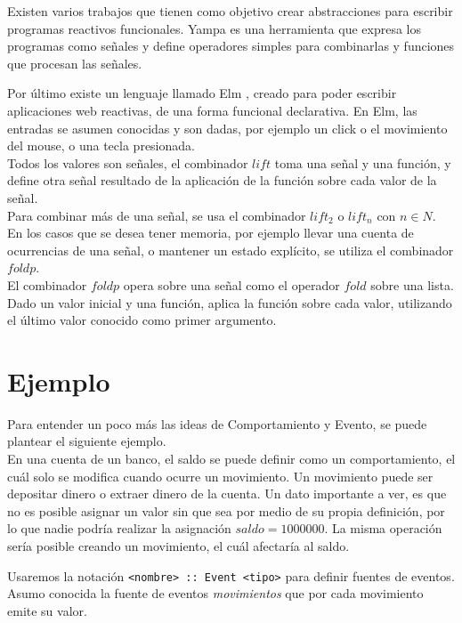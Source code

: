   Existen varios trabajos que tienen como objetivo crear abstracciones para escribir
programas reactivos funcionales.
  Yampa \cite{yampa} es una herramienta que expresa los programas como señales y
define operadores simples para combinarlas y funciones que procesan las señales.

  Por último existe un lenguaje llamado Elm \cite{evanczaplicki2012:Elm}, creado para
poder escribir aplicaciones web reactivas, de una forma funcional declarativa.
  En Elm, las entradas se asumen conocidas y son dadas, por ejemplo un click o el movimiento del mouse,
o una tecla presionada.\\
  Todos los valores son señales, el combinador $lift$
toma una señal y una función, y define otra señal resultado de la aplicación de la función
sobre cada valor de la señal.\\
  Para combinar más de una señal, se usa el combinador $lift_2$ o $lift_n$ con $n \in N$.\\
  En los casos que se desea tener memoria, por ejemplo llevar una cuenta de ocurrencias
  de una señal, o mantener un estado explícito, se utiliza el combinador $foldp$.\\

  El combinador $foldp$ opera sobre una señal como el operador $fold$ sobre una lista. Dado
un valor inicial y una función, aplica la función sobre cada valor, utilizando el último
valor conocido como primer argumento.


\section{Ejemplo}

Para entender un poco más las ideas de Comportamiento y Evento, se puede
plantear el siguiente ejemplo.\\

  En una cuenta de un banco, el saldo se puede definir
como un comportamiento, el cuál solo se modifica cuando ocurre
un movimiento.
  Un movimiento puede ser depositar dinero o extraer
dinero de la cuenta.
  Un dato importante a ver, es que no es posible asignar un valor
sin que sea por medio de su propia definición, por lo que nadie
podría realizar la asignación $saldo = 1000000$.
  La misma operación sería posible creando un movimiento, el cuál
afectaría al saldo.

  Usaremos la notación \texttt{<nombre> :: Event <tipo>} para definir
fuentes de eventos.
  Asumo conocida la fuente de eventos \emph{movimientos} que por
cada movimiento emite su valor.

